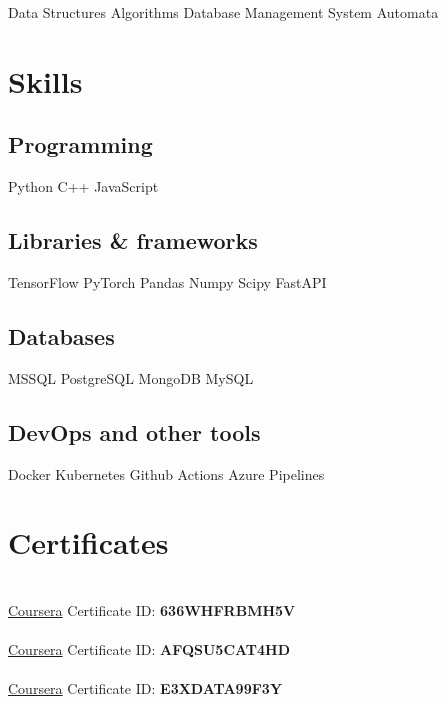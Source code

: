 \documentclass[]{deedy-resume-openfont}
\begin{document}

Data Structures \textbullet{} Algorithms \textbullet{} Database Management System \textbullet{} Automata

\sectionsep

\section{Skills}
\begin{minipage}[t]{.6\textwidth}
\subsection{Programming}
Python \textbullet{}   C++ \textbullet{} JavaScript
\subsection{Libraries \& frameworks}
TensorFlow \textbullet{} PyTorch \textbullet{} Pandas \textbullet{} Numpy \textbullet{} Scipy \textbullet{} FastAPI
\subsection{Databases}
MSSQL \textbullet{} PostgreSQL \textbullet{} MongoDB \textbullet{} MySQL
\subsection{DevOps and other tools}
Docker \textbullet{} Kubernetes \textbullet{} Github Actions \textbullet{} Azure Pipelines
\sectionsep
\end{minipage}

\sectionsep

\section{Certificates}
\\
\href{https://www.coursera.org/account/accomplishments/verify/636WHFRBMH5V}{\faCertificate\; Coursera} \textbullet{} Certificate ID: \textbf{636WHFRBMH5V}
\vspace{\topsep}\\
\\
\href{https://www.coursera.org/account/accomplishments/verify/AFQSU5CAT4HD}{\faCertificate\; Coursera} \textbullet{} Certificate ID: \textbf{AFQSU5CAT4HD}
\vspace{\topsep}\\
\\
\href{https://www.coursera.org/account/accomplishments/verify/E3XDATA99F3Y}{\faCertificate\; Coursera} \textbullet{} Certificate ID: \textbf{E3XDATA99F3Y}


\end{document}
